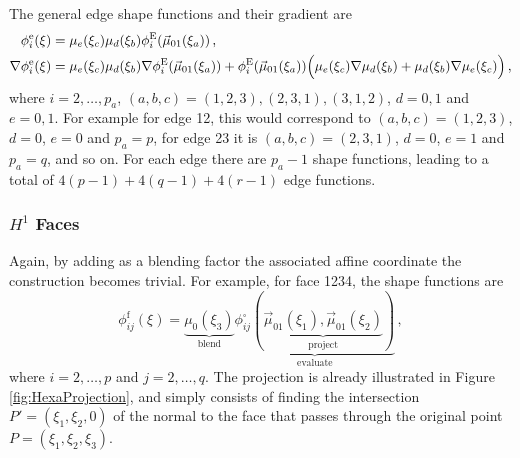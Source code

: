 The general edge shape functions and their gradient are
\begin{equation}
	\begin{aligned}
		\phi_i^\mathrm{e}(\xi)&=\mu_e(\xi_c)\mu_d(\xi_b)\phi_i^{\mathrm{E}}(\vec{\mu}_{01}(\xi_a))\,,\\
		\nabla\phi_i^\mathrm{e}(\xi)&=\mu_e(\xi_c)\mu_d(\xi_b)\nabla\phi_i^{\mathrm{E}}(\vec{\mu}_{01}(\xi_a))
			+\phi_i^{\mathrm{E}}(\vec{\mu}_{01}(\xi_a))\Big(\mu_e(\xi_c)\nabla\mu_d(\xi_b)+\mu_d(\xi_b)\nabla\mu_e(\xi_c)\Big)\,,
	\end{aligned}
	\label{eq:Hexaphigeneral}
\end{equation}
where $i=2,\ldots,p_a$, $(a,b,c)=(1,2,3),(2,3,1),(3,1,2)$, $d=0,1$ and $e=0,1$.
For example for edge 12, this would correspond to $(a,b,c)=(1,2,3)$, $d=0$, $e=0$ and $p_a=p$, for edge 23 it is $(a,b,c)=(2,3,1)$, $d=0$, $e=1$ and $p_a=q$, and so on. 
For each edge there are $p_a-1$ shape functions, leading to a total of $4(p-1)+4(q-1)+4(r-1)$ edge functions.


\subsubsection{\texorpdfstring{$H^1$}{H1} Faces}

Again, by adding as a blending factor the associated affine coordinate the construction becomes trivial. 
For example, for face 1234, the shape functions are
\begin{equation*}
	\phi_{ij}^\mathrm{f}(\xi)=\underbrace{\mu_0(\xi_3)}_{\text{blend}}
		\underbrace{\phi_{ij}^\square(\underbrace{\vec{\mu}_{01}(\xi_1),\vec{\mu}_{01}(\xi_2)}_{\text{project}})}_{\text{evaluate}}\,,
\end{equation*}
where $i=2,\ldots,p$ and $j=2,\ldots,q$. 
The projection is already illustrated in Figure \ref{fig:HexaProjection}, and simply consists of finding the intersection $P'=(\xi_1,\xi_2,0)$ of the normal to the face that passes through the original point $P=(\xi_1,\xi_2,\xi_3)$.
%

